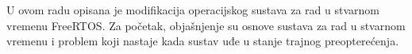 \documentclass[../zavrsni.tex]{subfiles}
\begin{document}
\sloppy

\justifying

U ovom radu opisana je modifikacija operacijskog sustava za rad u stvarnom vremenu FreeRTOS. Za početak, objašnjenje su osnove sustava za 
rad u stvarnom vremenu i problem koji nastaje kada sustav uđe u stanje trajnog preopterećenja. 
\end{document}
